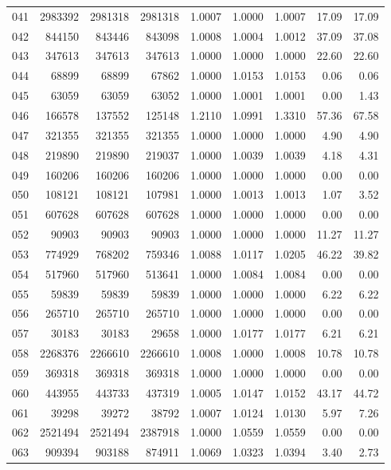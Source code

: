 \begin{longtable}{crrrrrrrr}
041 & 2983392 & 2981318 & 2981318 & 1.0007 & 1.0000 & 1.0007 & 17.09 & 17.09 \\
042 & 844150 & 843446 & 843098 & 1.0008 & 1.0004 & 1.0012 & 37.09 & 37.08 \\
043 & 347613 & 347613 & 347613 & 1.0000 & 1.0000 & 1.0000 & 22.60 & 22.60 \\
044 & 68899 & 68899 & 67862 & 1.0000 & 1.0153 & 1.0153 & 0.06 & 0.06 \\
045 & 63059 & 63059 & 63052 & 1.0000 & 1.0001 & 1.0001 & 0.00 & 1.43 \\
046 & 166578 & 137552 & 125148 & 1.2110 & 1.0991 & 1.3310 & 57.36 & 67.58 \\
047 & 321355 & 321355 & 321355 & 1.0000 & 1.0000 & 1.0000 & 4.90 & 4.90 \\
048 & 219890 & 219890 & 219037 & 1.0000 & 1.0039 & 1.0039 & 4.18 & 4.31 \\
049 & 160206 & 160206 & 160206 & 1.0000 & 1.0000 & 1.0000 & 0.00 & 0.00 \\
050 & 108121 & 108121 & 107981 & 1.0000 & 1.0013 & 1.0013 & 1.07 & 3.52 \\
051 & 607628 & 607628 & 607628 & 1.0000 & 1.0000 & 1.0000 & 0.00 & 0.00 \\
052 & 90903 & 90903 & 90903 & 1.0000 & 1.0000 & 1.0000 & 11.27 & 11.27 \\
053 & 774929 & 768202 & 759346 & 1.0088 & 1.0117 & 1.0205 & 46.22 & 39.82 \\
054 & 517960 & 517960 & 513641 & 1.0000 & 1.0084 & 1.0084 & 0.00 & 0.00 \\
055 & 59839 & 59839 & 59839 & 1.0000 & 1.0000 & 1.0000 & 6.22 & 6.22 \\
056 & 265710 & 265710 & 265710 & 1.0000 & 1.0000 & 1.0000 & 0.00 & 0.00 \\
057 & 30183 & 30183 & 29658 & 1.0000 & 1.0177 & 1.0177 & 6.21 & 6.21 \\
058 & 2268376 & 2266610 & 2266610 & 1.0008 & 1.0000 & 1.0008 & 10.78 & 10.78 \\
059 & 369318 & 369318 & 369318 & 1.0000 & 1.0000 & 1.0000 & 0.00 & 0.00 \\
060 & 443955 & 443733 & 437319 & 1.0005 & 1.0147 & 1.0152 & 43.17 & 44.72 \\
061 & 39298 & 39272 & 38792 & 1.0007 & 1.0124 & 1.0130 & 5.97 & 7.26 \\
062 & 2521494 & 2521494 & 2387918 & 1.0000 & 1.0559 & 1.0559 & 0.00 & 0.00 \\
063 & 909394 & 903188 & 874911 & 1.0069 & 1.0323 & 1.0394 & 3.40 & 2.73 \\

\end{longtable}

